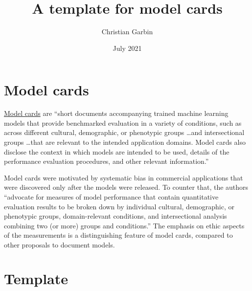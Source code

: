 \documentclass{article}
\title{A template for model cards}
\author{Christian Garbin}
\date{July 2021}
\begin{document}
\maketitle

\section{Model cards}

\href{https://arxiv.org/abs/1810.03993}{Model cards} are ``short documents accompanying trained machine learning models that provide benchmarked evaluation in a variety of conditions, such as across different cultural, demographic, or phenotypic groups \ldots and intersectional groups \ldots that are relevant to the intended application domains. Model cards also disclose the context in which models are intended to be used, details of the performance evaluation procedures, and other relevant information.''

Model cards were motivated by systematic bias in commercial applications that were discovered only after the models were released. To counter that, the authors ``advocate for measures of model performance that contain quantitative evaluation results to be broken down by individual cultural, demographic, or phenotypic groups, domain-relevant conditions, and intersectional analysis combining two (or more) groups and conditions.'' The emphasis on ethic aspects of the measurements is a distinguishing feature of model cards, compared to other proposals to document models.

\section{Template}

\newenvironment{mcsection}[1]
    {%
        \textbf{#1}

        \begin{itemize}[leftmargin=*,topsep=0pt,itemsep=-1ex,partopsep=1ex,parsep=1ex,after=\vspace{\medskipamount}]
    }
    {%
        \end{itemize}
    }
\end{document}
